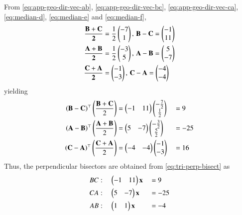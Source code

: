 \solution
From 
		\eqref{eq:app-geo-dir-vec-ab},
		\eqref{eq:app-geo-dir-vec-bc},
		\eqref{eq:app-geo-dir-vec-ca},
	\eqref{eq:median-d},
	\eqref{eq:median-e}
	and
	\eqref{eq:median-f},
\begin{align}
\mathbf{\frac{\mathbf{B}+\mathbf{C}}{2}} &= \frac{1}{2}\begin{pmatrix}-{7} \\ 1\end{pmatrix},\,
\mathbf{B}-\mathbf{C} = \begin{pmatrix}-1 \\ 11\end{pmatrix} 
\\
\mathbf{\frac{\mathbf{A}+\mathbf{B}}{2}}&=\frac{1}{2}\begin{pmatrix}-{3} \\{5}\end{pmatrix},\,
\mathbf{A}-\mathbf{B}=\begin{pmatrix}5\\ -7\end{pmatrix} \\
\mathbf{\frac{\mathbf{C}+\mathbf{A}}{2}} &= \begin{pmatrix}-1\\-3\end{pmatrix},\,
\mathbf{C}-\mathbf{A} = \begin{pmatrix}-4\\-4\end{pmatrix} 
\end{align}
yielding
\begin{alignat}{2}
  \left(\mathbf{B}-\mathbf{C}\right)^{\top}\left(\frac{\mathbf{B}+\mathbf{C}}{2}\right)
	&=\begin{pmatrix}-1&11\end{pmatrix}\begin{pmatrix}-\frac{7}{2} \\ \frac{1}{2}\end{pmatrix}
	&&=9
  \\
\left(\mathbf{A}-\mathbf{B}\right)^{\top}\left(\frac{\mathbf{A}+\mathbf{B}}{2}\right)
	&=\begin{pmatrix}5&-7\end{pmatrix}\begin{pmatrix}-\frac{3}{2} \\\frac{5}{2}\end{pmatrix}
	&&=-25
  \\
\left(\mathbf{C}-\mathbf{A}\right)^{\top}\left(\frac{\mathbf{C}+\mathbf{A}}{2}\right)
	&=\begin{pmatrix}-4&-4\end{pmatrix}\begin{pmatrix}-1\\-3\end{pmatrix}
	&&=16
\end{alignat}
Thus, the perpendicular bisectors are obtained from 
			\eqref{eq:tri-perp-bisect}
			as
		\begin{alignat}{2}
			\label{eq:app-tri-perp-bisect-bc}
			BC&: \quad \begin{pmatrix}-1&11\end{pmatrix}\mathbf{x}&&=9
\\
			\label{eq:app-tri-perp-bisect-ca}
			CA&: \quad \begin{pmatrix}5&-7\end{pmatrix}\mathbf{x}&&=-25
\\
			\label{eq:app-tri-perp-bisect-ab}
			AB&: \quad \begin{pmatrix}1&1\end{pmatrix}\mathbf{x}&&=-4
		\end{alignat}



